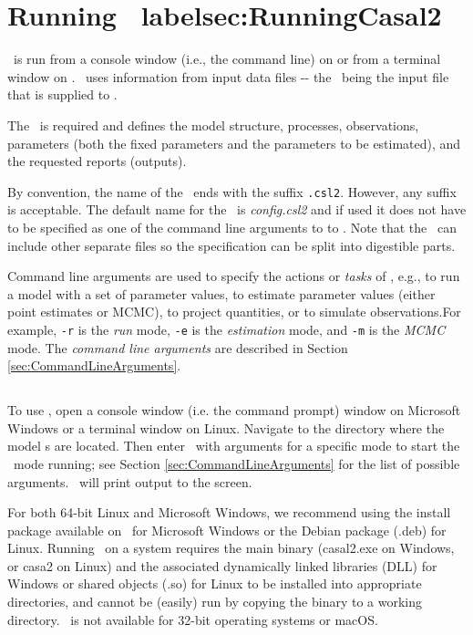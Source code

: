 \section{Running \CNAME\ label{sec:RunningCasal2}}

\CNAME\ is run from a console window (i.e., the command line) on  or from a terminal window on . \CNAME\ uses information from input data files -{}- the \emph{\config{}}\ being the input file that is supplied to \CNAME.

The \config\ is required and defines the model structure, processes, observations, parameters (both the fixed parameters and the parameters to be estimated), and the requested reports (outputs).

By convention, the name of the \config\ ends with the suffix \texttt{.csl2}. However, any suffix is acceptable. The default name for the \config\ is \emph{config.csl2} and if used it does not have to be specified as one of the command line arguments to to \CNAME. Note that the \config\ can include other separate files so the specification can be split into digestible parts. 

Command line arguments are used to specify the actions or \emph{tasks} of \CNAME, e.g., to run a model with a set of parameter values, to estimate parameter values (either point estimates or MCMC), to project quantities, or to simulate observations.For example, \texttt{-r} is the \emph{run} mode, \texttt{-e} is the \emph{estimation} mode, and \texttt{-m} is the \emph{MCMC} mode. The \emph{command line arguments} are described in Section \ref{sec:CommandLineArguments}.

\subsection{}

To use \CNAME, open a console window (i.e. the command prompt) window on Microsoft Windows or a terminal window on Linux. Navigate to the directory where the model \config s are located. Then enter \CNAME\ with arguments for a specific mode to start the \CNAME\ mode running; see Section \ref{sec:CommandLineArguments} for the list of possible arguments. \CNAME\ will print output to the screen.

For both 64-bit Linux and Microsoft Windows, we recommend using the install package available on \github\ for Microsoft Windows or the Debian package (.deb) for Linux. Running \CNAME\ on a system requires the main binary (casal2.exe on Windows, or casa2 on Linux) and the associated dynamically linked libraries (DLL) for Windows or shared objects (.so) for Linux to be installed into appropriate directories, and cannot be (easily) run by copying the binary to a working directory. \CNAME\ is not available for 32-bit operating systems or macOS.

